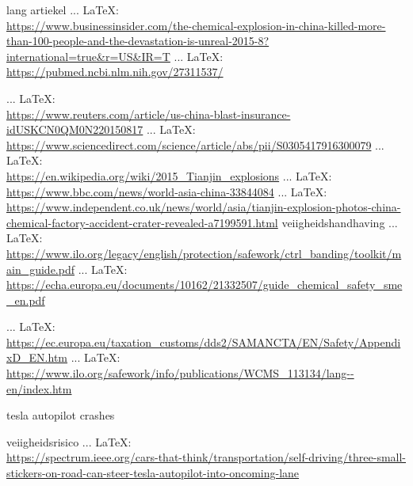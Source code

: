 \begin{thebibliography}{99}
{{{{    lang artiekel
     ... \LaTeX:\\ \url{https://www.businessinsider.com/the-chemical-explosion-in-china-killed-more-than-100-people-and-the-devastation-is-unreal-2015-8?international=true&r=US&IR=T}
     ... \LaTeX:\\ \url{https://pubmed.ncbi.nlm.nih.gov/27311537/}

     ... \LaTeX:\\ \url{https://www.reuters.com/article/us-china-blast-insurance-idUSKCN0QM0N220150817}
     ... \LaTeX:\\ \url{https://www.sciencedirect.com/science/article/abs/pii/S0305417916300079}
     ... \LaTeX:\\ \url{https://en.wikipedia.org/wiki/2015_Tianjin_explosions}
     ... \LaTeX:\\ \url{https://www.bbc.com/news/world-asia-china-33844084}
     ... \LaTeX:\\ \url{https://www.independent.co.uk/news/world/asia/tianjin-explosion-photos-china-chemical-factory-accident-crater-revealed-a7199591.html}
    veiigheidshandhaving
     ... \LaTeX:\\ \url{https://www.ilo.org/legacy/english/protection/safework/ctrl_banding/toolkit/main_guide.pdf}
     ... \LaTeX:\\ \url{https://echa.europa.eu/documents/10162/21332507/guide_chemical_safety_sme_en.pdf}

     ... \LaTeX:\\ \url{https://ec.europa.eu/taxation_customs/dds2/SAMANCTA/EN/Safety/AppendixD_EN.htm}
     ... \LaTeX:\\ \url{https://www.ilo.org/safework/info/publications/WCMS_113134/lang--en/index.htm}


tesla autopilot crashes


veiigheidsrisico
 ... \LaTeX:\\ \url{https://spectrum.ieee.org/cars-that-think/transportation/self-driving/three-small-stickers-on-road-can-steer-tesla-autopilot-into-oncoming-lane}

}}}}
\end{thebibliography}
